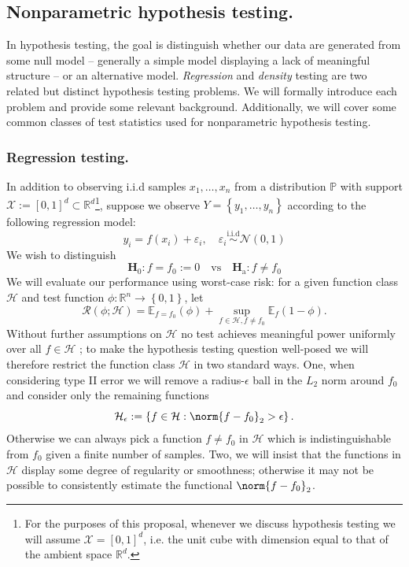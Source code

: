 \documentclass{article}
\newcommand{\Reals}{\mathbb{R}}
\newcommand{\set}[1]{\left\{#1\right\}}
\newcommand{\1}{\mathbf{1}}
\newcommand{\Ebb}{\mathbb{E}}
\theoremstyle{alden}
\theoremstyle{aldenthm}
\theoremstyle{definition}
\theoremstyle{remark}
\begin{document}
\subsection{Nonparametric hypothesis testing.}

In hypothesis testing, the goal is distinguish whether our data are generated from some null model -- generally a simple model displaying a lack of meaningful structure -- or an alternative model. \emph{Regression} and \emph{density} testing are two related but distinct hypothesis testing problems. We will formally introduce each problem and provide some relevant background. Additionally, we will cover some common classes of test statistics used for nonparametric hypothesis testing.

\subsubsection{Regression testing.}

In addition to observing i.i.d samples $x_1,\ldots,x_n$ from a distribution $\mathbb{P}$ with support $\mathcal{X} := [0,1]^d \subset \Reals^d$\footnote{For the purposes of this proposal, whenever we discuss hypothesis testing we will assume $\mathcal{X} = [0,1]^d$, i.e. the unit cube with dimension equal to that of the ambient space $\Reals^d$.}, suppose we observe $Y = \set{y_1,\ldots,y_n}$ according to the following regression model:
\begin{equation}
\label{eqn:regression}
y_i = f(x_i) + \varepsilon_i, \quad \varepsilon_i \overset{\textrm{i.i.d}}{\sim} \mathcal{N}(0,1)
\end{equation}
We wish to distinguish
\begin{equation*}
\mathbf{H}_0: f = f_0 := 0 \quad \textrm{vs} \quad \mathbf{H}_{\textrm{a}}: f \neq f_0
\end{equation*}
We will evaluate our performance using worst-case risk: for a given function class $\mathcal{H}$ and test function $\phi: \Reals^n \to \set{0,1}$, let
\begin{equation*}
\mathcal{R}(\phi; \mathcal{H}) = \Ebb_{f = f_0}(\phi) + \sup_{f \in \mathcal{H}, f \neq f_0} \Ebb_f(1 - \phi).
\end{equation*}
Without further assumptions on $\mathcal{H}$ no test achieves meaningful power uniformly over all $f \in \mathcal{H}$ \citet{janssen2000}; to make the hypothesis testing question well-posed we will therefore restrict the function class $\mathcal{H}$ in two standard ways. One, when considering type II error we will remove a radius-$\epsilon$ ball in the $L_2$ norm around $f_0$ and consider only the remaining functions
\begin{equation*}
\mathcal{H}_{\epsilon} := \set{f \in \mathcal{H}:\norm{f - f_0}_2 > \epsilon}.
\end{equation*}
Otherwise we can always pick a function $f \neq f_0$ in $\mathcal{H}$ which is indistinguishable from $f_0$ given a finite number of samples. Two, we will insist that the functions in $\mathcal{H}$ display some degree of regularity or smoothness; otherwise it may not be possible to consistently estimate the functional $\norm{f - f_0}_2$. 
\end{document}
